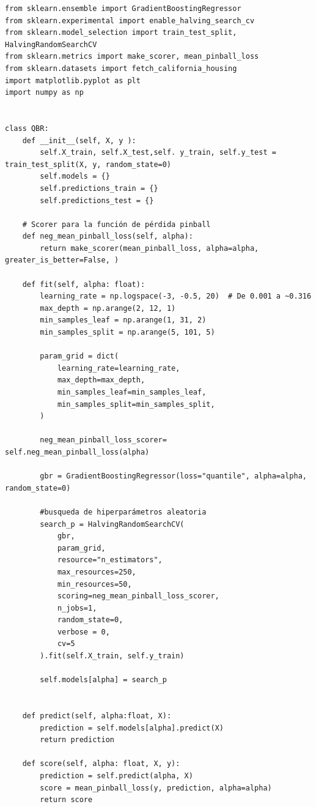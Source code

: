 \documentclass[11pt]{book}
\theoremstyle{plain} %
\theoremstyle{definition} %
\begin{document}
 \begin{lstlisting}[style=pythonstyle, caption=quantileboosting.py]
   from sklearn.ensemble import GradientBoostingRegressor
from sklearn.experimental import enable_halving_search_cv
from sklearn.model_selection import train_test_split, HalvingRandomSearchCV 
from sklearn.metrics import make_scorer, mean_pinball_loss
from sklearn.datasets import fetch_california_housing
import matplotlib.pyplot as plt
import numpy as np


class QBR:
    def __init__(self, X, y ):
        self.X_train, self.X_test,self. y_train, self.y_test = train_test_split(X, y, random_state=0)
        self.models = {}
        self.predictions_train = {}
        self.predictions_test = {}

    # Scorer para la función de pérdida pinball
    def neg_mean_pinball_loss(self, alpha):
        return make_scorer(mean_pinball_loss, alpha=alpha, greater_is_better=False, )
    
    def fit(self, alpha: float):
        learning_rate = np.logspace(-3, -0.5, 20)  # De 0.001 a ~0.316
        max_depth = np.arange(2, 12, 1)
        min_samples_leaf = np.arange(1, 31, 2)
        min_samples_split = np.arange(5, 101, 5)

        param_grid = dict(
            learning_rate=learning_rate,
            max_depth=max_depth,
            min_samples_leaf=min_samples_leaf,
            min_samples_split=min_samples_split,
        )

        neg_mean_pinball_loss_scorer= self.neg_mean_pinball_loss(alpha)

        gbr = GradientBoostingRegressor(loss="quantile", alpha=alpha, random_state=0)

        #busqueda de hiperparámetros aleatoria
        search_p = HalvingRandomSearchCV(
            gbr,
            param_grid,
            resource="n_estimators",
            max_resources=250,
            min_resources=50,
            scoring=neg_mean_pinball_loss_scorer,
            n_jobs=1,
            random_state=0,
            verbose = 0,
            cv=5
        ).fit(self.X_train, self.y_train)

        self.models[alpha] = search_p
        

    def predict(self, alpha:float, X):
        prediction = self.models[alpha].predict(X)
        return prediction
    
    def score(self, alpha: float, X, y):
        prediction = self.predict(alpha, X)
        score = mean_pinball_loss(y, prediction, alpha=alpha)
        return score
 \end{lstlisting}
\end{document}
